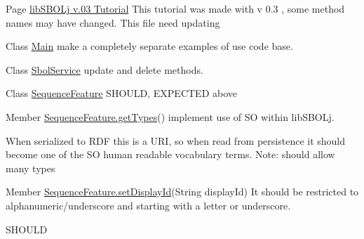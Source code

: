 \label{todo__todo000011}
\hypertarget{todo__todo000011}{}
 
\begin{DoxyDescription}
\item[Page \hyperlink{tutorial}{libSBOLj v.03 Tutorial} ]This tutorial was made with v 0.3 , some method names may have changed. This file need updating
\end{DoxyDescription}

\label{todo__todo000012}
\hypertarget{todo__todo000012}{}
 
\begin{DoxyDescription}
\item[Class \hyperlink{classlib_s_b_o_lj_use_example_1_1_main}{Main} ]make a completely separate examples of use code base.
\end{DoxyDescription}

\label{todo__todo000006}
\hypertarget{todo__todo000006}{}
 
\begin{DoxyDescription}
\item[Class \hyperlink{classorg_1_1sbolstandard_1_1lib_s_b_o_lj_1_1_sbol_service}{SbolService} ]update and delete methods.
\end{DoxyDescription}

\label{todo__todo000007}
\hypertarget{todo__todo000007}{}
 
\begin{DoxyDescription}
\item[Class \hyperlink{classorg_1_1sbolstandard_1_1lib_s_b_o_lj_1_1_sequence_feature}{SequenceFeature} ]SHOULD, EXPECTED above
\end{DoxyDescription}

\label{todo__todo000009}
\hypertarget{todo__todo000009}{}
 
\begin{DoxyDescription}
\item[Member \hyperlink{classorg_1_1sbolstandard_1_1lib_s_b_o_lj_1_1_sequence_feature_a518b97368db3de477d5fb57150d8b711}{SequenceFeature.getTypes}() ]implement use of SO within libSBOLj. 

When serialized to RDF this is a URI, so when read from persistence it should become one of the SO human readable vocabulary terms. Note: should allow many types 
\end{DoxyDescription}

\label{todo__todo000008}
\hypertarget{todo__todo000008}{}
 
\begin{DoxyDescription}
\item[Member \hyperlink{classorg_1_1sbolstandard_1_1lib_s_b_o_lj_1_1_sequence_feature_a46b93a70e7bd612a7b429aac4829bc88}{SequenceFeature.setDisplayId}(String displayId) ]It should be restricted to alphanumeric/underscore and starting with a letter or underscore. 

SHOULD 
\end{DoxyDescription}